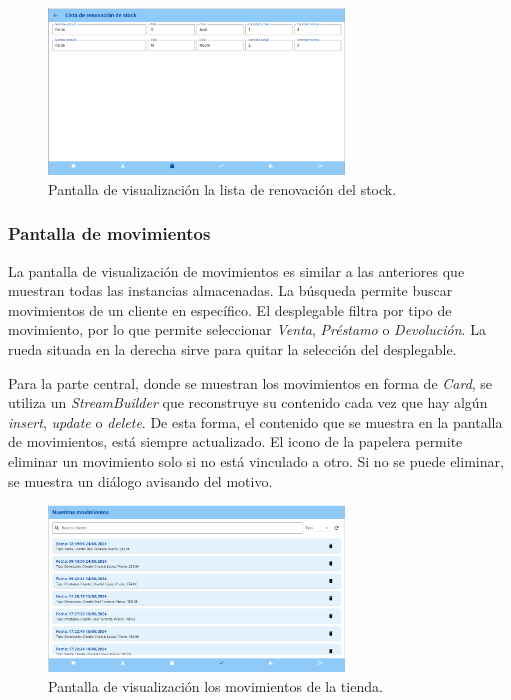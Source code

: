 \begin{figure}[H]
	\centering
	\includegraphics[width=0.7\textwidth]{imagenes/TerceraIteracion/stock.png}
	\caption{Pantalla de visualización la lista de renovación del stock.}
\end{figure}

\newpage

\subsubsection{Pantalla de movimientos}

La pantalla de visualización de movimientos es similar a las anteriores que muestran todas las instancias almacenadas. La búsqueda permite buscar movimientos de un cliente en específico. El desplegable filtra por tipo de movimiento, por lo que permite seleccionar \textit{Venta}, \textit{Préstamo} o \textit{Devolución}. La rueda situada en la derecha sirve para quitar la selección del desplegable. 

Para la parte central, donde se muestran los movimientos en forma de \textit{Card}, se utiliza un \textit{StreamBuilder} que reconstruye su contenido cada vez que hay algún \textit{insert}, \textit{update} o \textit{delete}. De esta forma, el contenido que se muestra en la pantalla de movimientos, está siempre actualizado. El icono de la papelera permite eliminar un movimiento solo si no está vinculado a otro. Si no se puede eliminar, se muestra un diálogo avisando del motivo.   

\begin{figure}[H]
	\centering
	\includegraphics[width=0.7\textwidth]{imagenes/TerceraIteracion/movementsView.png}
	\caption{Pantalla de visualización los movimientos de la tienda.}
\end{figure}

